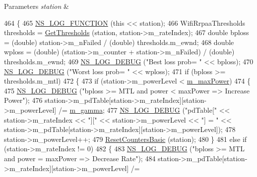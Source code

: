 \begin{DoxyParams}{Parameters}
{\em station} & \\
\hline
\end{DoxyParams}

\begin{DoxyCode}
464 \{
465   \hyperlink{log-macros-disabled_8h_a90b90d5bad1f39cb1b64923ea94c0761}{NS\_LOG\_FUNCTION} (\textcolor{keyword}{this} << station);
466   WifiRrpaaThresholds thresholds = \hyperlink{classns3_1_1RrpaaWifiManager_a24c9e8ec2c007b3f48cb7b38d4b6a39d}{GetThresholds} (station, station->m\_rateIndex);
467   \textcolor{keywordtype}{double} bploss = (double) station->m\_nFailed / (\textcolor{keywordtype}{double}) thresholds.m\_ewnd;
468   \textcolor{keywordtype}{double} wploss = (double) (station->m\_counter + station->m\_nFailed) / (double) thresholds.m\_ewnd;
469   \hyperlink{group__logging_ga413f1886406d49f59a6a0a89b77b4d0a}{NS\_LOG\_DEBUG} (\textcolor{stringliteral}{"Best loss prob= "} << bploss);
470   \hyperlink{group__logging_ga413f1886406d49f59a6a0a89b77b4d0a}{NS\_LOG\_DEBUG} (\textcolor{stringliteral}{"Worst loss prob= "} << wploss);
471   \textcolor{keywordflow}{if} (bploss >= thresholds.m\_mtl)
472     \{
473       \textcolor{keywordflow}{if} (station->m\_powerLevel < \hyperlink{classns3_1_1RrpaaWifiManager_a8f5659ec5d99c385dcde039364b0ec8a}{m\_maxPower})
474         \{
475           \hyperlink{group__logging_ga413f1886406d49f59a6a0a89b77b4d0a}{NS\_LOG\_DEBUG} (\textcolor{stringliteral}{"bploss >= MTL and power < maxPower => Increase Power"});
476           station->m\_pdTable[station->m\_rateIndex][station->m\_powerLevel] /= 
      \hyperlink{classns3_1_1RrpaaWifiManager_ac328ed40e8e145afd21934caf52898b4}{m\_gamma};
477           \hyperlink{group__logging_ga413f1886406d49f59a6a0a89b77b4d0a}{NS\_LOG\_DEBUG} (\textcolor{stringliteral}{"pdTable["} << station->m\_rateIndex << \textcolor{stringliteral}{"]["} << station->m\_powerLevel << \textcolor{stringliteral}{
      "] = "} << station->m\_pdTable[station->m\_rateIndex][station->m\_powerLevel]);
478           station->m\_powerLevel++;
479           \hyperlink{classns3_1_1RrpaaWifiManager_a09b0daa8aa5414f393f6b8fb2a3043ca}{ResetCountersBasic} (station);
480         \}
481       \textcolor{keywordflow}{else} \textcolor{keywordflow}{if} (station->m\_rateIndex != 0)
482         \{
483           \hyperlink{group__logging_ga413f1886406d49f59a6a0a89b77b4d0a}{NS\_LOG\_DEBUG} (\textcolor{stringliteral}{"bploss >= MTL and power = maxPower => Decrease Rate"});
484           station->m\_pdTable[station->m\_rateIndex][station->m\_powerLevel] /= 

\end{DoxyCode}
